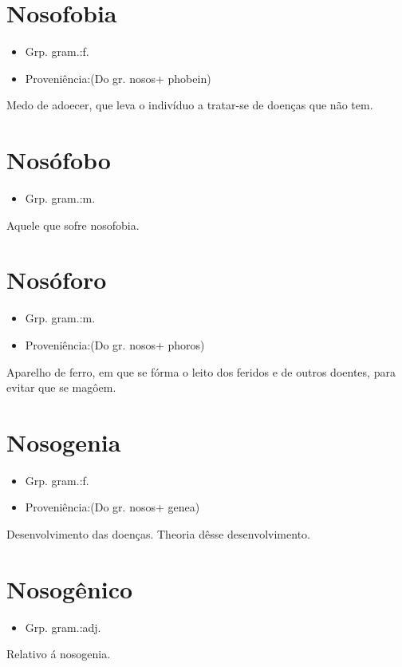 \section{Nosofobia}
\begin{itemize}
\item {Grp. gram.:f.}
\end{itemize}
\begin{itemize}
\item {Proveniência:(Do gr. \textunderscore nosos\textunderscore  + \textunderscore phobein\textunderscore )}
\end{itemize}
Medo de adoecer, que leva o indivíduo a tratar-se de doenças que não tem.
\section{Nosófobo}
\begin{itemize}
\item {Grp. gram.:m.}
\end{itemize}
Aquele que sofre nosofobia.
\section{Nosóforo}
\begin{itemize}
\item {Grp. gram.:m.}
\end{itemize}
\begin{itemize}
\item {Proveniência:(Do gr. \textunderscore nosos\textunderscore  + \textunderscore phoros\textunderscore )}
\end{itemize}
Aparelho de ferro, em que se fórma o leito dos feridos e de outros doentes, para evitar que se magôem.
\section{Nosogenia}
\begin{itemize}
\item {Grp. gram.:f.}
\end{itemize}
\begin{itemize}
\item {Proveniência:(Do gr. \textunderscore nosos\textunderscore  + \textunderscore genea\textunderscore )}
\end{itemize}
Desenvolvimento das doenças.
Theoria dêsse desenvolvimento.
\section{Nosogênico}
\begin{itemize}
\item {Grp. gram.:adj.}
\end{itemize}
Relativo á nosogenia.
